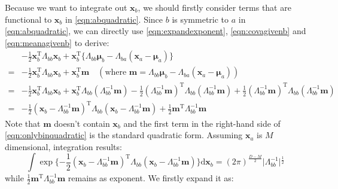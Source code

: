 Because we want to integrate out $\mathbf{x}_b$, we should firstly consider
terms that are functional to $\mathbf{x}_b$ in
\eqref{eqn:abquadratic}. Since $b$ is symmetric to $a$ in
\eqref{eqn:abquadratic}, we can directly use
\eqref{eqn:expandexponent}, \eqref{eqn:covagivenb} and
\eqref{eqn:meanagivenb} to derive:
\begin{equation}
\begin{split}
&-\frac{1}{2}\mathbf{x}_{b}^{\mathrm{T}}\Lambda_{bb}\mathbf{x}_{b}+\mathbf{x}_{b}^{\mathrm{T}}\{\Lambda_{bb}\boldsymbol{\mu}_{b}-\Lambda_{ba}(\mathbf{x}_{a}-\boldsymbol{\mu}_{a})\}\\
=&-\frac{1}{2}\mathbf{x}_{b}^{\mathrm{T}}\Lambda_{bb}\mathbf{x}_{b}+\mathbf{x}_{b}^{\mathrm{T}}\mathbf{m}\quad{}(\text{where }\mathbf{m}=\Lambda_{bb}\boldsymbol{\mu}_{b}-\Lambda_{ba}(\mathbf{x}_{a}-\boldsymbol{\mu}_{a}))\\
=&-\frac{1}{2}\mathbf{x}_{b}^{\mathrm{T}}\Lambda_{bb}\mathbf{x}_{b}+\mathbf{x}_{b}^{\mathrm{T}}\Lambda_{bb}(\Lambda_{bb}^{-1}\mathbf{m})-\frac{1}{2}(\Lambda_{bb}^{-1}\mathbf{m})^{\mathrm{T}}\Lambda_{bb}(\Lambda_{bb}^{-1}\mathbf{m})+\frac{1}{2}(\Lambda_{bb}^{-1}\mathbf{m})^{\mathrm{T}}\Lambda_{bb}(\Lambda_{bb}^{-1}\mathbf{m})\\
=&-\frac{1}{2}(\mathbf{x}_{b}-\Lambda_{bb}^{-1}\mathbf{m})^{\mathrm{T}}\Lambda_{bb}(\mathbf{x}_{b}-\Lambda_{bb}^{-1}\mathbf{m})+\frac{1}{2}\mathbf{m}^{\mathrm{T}}\Lambda_{bb}^{-1}\mathbf{m}
\end{split}
\label{eqn:onlybinquadratic}
\end{equation}
Note that $\mathbf{m}$ doesn't contain $\mathbf{x}_b$ and the first
term in the right-hand side of \eqref{eqn:onlybinquadratic} is the
standard quadratic form. Assuming $\mathbf{x}_{a}$ is $M$ dimensional, integration results:
\begin{equation}
\int{}\exp{}\{-\frac{1}{2}(\mathbf{x}_{b}-\Lambda_{bb}^{-1}\mathbf{m})^{\mathrm{T}}\Lambda_{bb}(\mathbf{x}_{b}-\Lambda_{bb}^{-1}\mathbf{m})\}\text{d}\mathbf{x}_{b}=(2\pi)^{\frac{D-M}{2}}\vert{}\Lambda_{bb}^{-1}\vert{}^{\frac{1}{2}}
\label{eqn:intbresult}
\end{equation}
while $\frac{1}{2}\mathbf{m}^{\mathrm{T}}\Lambda_{bb}^{-1}\mathbf{m}$
remains as exponent. We firstly expand it as:

